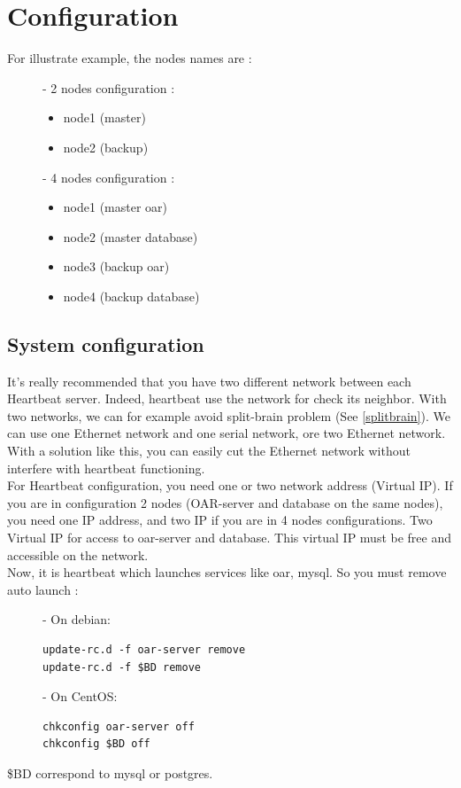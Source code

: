 \documentclass[a4paper,10pt]{report}
\begin{document}
\chapter{Configuration}

For illustrate example, the nodes names are :
\begin{description}
\item[]- 2 nodes configuration : 
\begin{itemize}
\item node1 (master)
\item node2 (backup)
\end{itemize}

\item[]- 4 nodes configuration :
\begin{itemize}
\item node1 (master oar)
\item node2 (master database)
\item node3 (backup oar)
\item node4 (backup database)
\end{itemize}
\end{description}


\section{System configuration}
\label{sysconf}
It's really recommended that you have two different network between each Heartbeat server. Indeed, heartbeat use the network for check its neighbor. With two networks, we can for example avoid split-brain problem (See \ref{splitbrain}). We can use one Ethernet network and one serial network, ore two Ethernet network. With a solution like this, you can easily cut the Ethernet network without interfere with heartbeat functioning.\\

For Heartbeat configuration, you need one or two network address (Virtual IP). If you are in configuration 2 nodes (OAR-server and database on the same nodes), you need one IP address, and two IP if you are in 4 nodes configurations. Two Virtual IP for access to oar-server and database. This virtual IP must be free and accessible on the network.\\

Now, it is heartbeat which launches services like oar, mysql. So you must remove auto launch :
\begin{description}
\item[]- On debian:
\begin{lstlisting}
update-rc.d -f oar-server remove
update-rc.d -f $BD remove
\end{lstlisting}
\item[]- On CentOS:
\begin{lstlisting}
chkconfig oar-server off
chkconfig $BD off
\end{lstlisting}
\end{description}
\$BD correspond to mysql or postgres.\\
\end{document}
